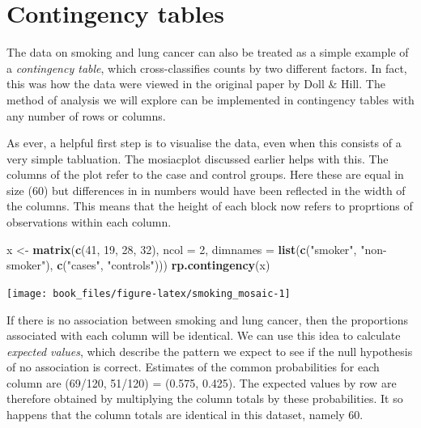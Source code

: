 \documentclass[
]{book}
\newenvironment{Shaded}{\begin{snugshade}}{\end{snugshade}}
\newcommand{\AttributeTok}[1]{\textcolor[rgb]{0.13,0.29,0.53}{#1}}
\newcommand{\DecValTok}[1]{\textcolor[rgb]{0.00,0.00,0.81}{#1}}
\newcommand{\FunctionTok}[1]{\textcolor[rgb]{0.13,0.29,0.53}{\textbf{#1}}}
\newcommand{\NormalTok}[1]{#1}
\newcommand{\OtherTok}[1]{\textcolor[rgb]{0.56,0.35,0.01}{#1}}
\newcommand{\StringTok}[1]{\textcolor[rgb]{0.31,0.60,0.02}{#1}}
\begin{document}
\section{Contingency tables}\label{contingency-tables}

The data on smoking and lung cancer can also be treated as a simple example of a \emph{contingency table}, which cross-classifies counts by two different factors. In fact, this was how the data were viewed in the original paper by Doll \& Hill. The method of analysis we will explore can be implemented in contingency tables with any number of rows or columns.

As ever, a helpful first step is to visualise the data, even when this consists of a very simple tabluation. The mosiacplot discussed earlier helps with this. The columns of the plot refer to the case and control groups. Here these are equal in size (60) but differences in in numbers would have been reflected in the width of the columns. This means that the height of each block now refers to proprtions of observations within each column.

\begin{Shaded}
\begin{Highlighting}[]
\NormalTok{x }\OtherTok{\textless{}{-}} \FunctionTok{matrix}\NormalTok{(}\FunctionTok{c}\NormalTok{(}\DecValTok{41}\NormalTok{, }\DecValTok{19}\NormalTok{, }\DecValTok{28}\NormalTok{, }\DecValTok{32}\NormalTok{), }\AttributeTok{ncol =} \DecValTok{2}\NormalTok{,}
            \AttributeTok{dimnames =} \FunctionTok{list}\NormalTok{(}\FunctionTok{c}\NormalTok{(}\StringTok{"smoker"}\NormalTok{, }\StringTok{"non{-}smoker"}\NormalTok{),}
                            \FunctionTok{c}\NormalTok{(}\StringTok{"cases"}\NormalTok{, }\StringTok{"controls"}\NormalTok{)))}
\FunctionTok{rp.contingency}\NormalTok{(x)}
\end{Highlighting}
\end{Shaded}

\begin{center}\texttt{[image: book\_files/figure-latex/smoking\_mosaic-1]} \end{center}

If there is no association between smoking and lung cancer, then the proportions associated with each column will be identical. We can use this idea to calculate \emph{expected values}, which describe the pattern we expect to see if the null hypothesis of no association is correct. Estimates of the common probabilities for each column are (69/120, 51/120) = (0.575, 0.425). The expected values by row are therefore obtained by multiplying the column totals by these probabilities. It so happens that the column totals are identical in this dataset, namely 60.
\end{document}
